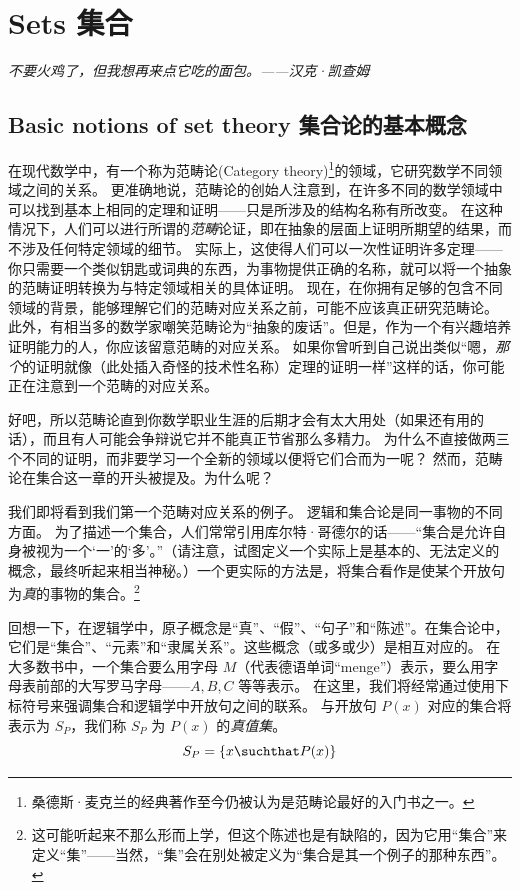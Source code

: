 \chapter{Sets 集合}
\label{ch:sets}

{\em 不要火鸡了，但我想再来点它吃的面包。——汉克·凯查姆}

\section{Basic notions of set theory 集合论的基本概念}
\label{sec:basic_set_notions}

在现代数学中，有一个称为范畴论(Category theory)\footnote{桑德斯·麦克兰的经典著作\cite{macl}至今仍被认为是范畴论最好的入门书之一。}的领域，它研究数学不同领域之间的关系。
更准确地说，范畴论的创始人注意到，在许多不同的数学领域中可以找到基本上相同的定理和证明——只是所涉及的结构名称有所改变。
在这种情况下，人们可以进行所谓的\emph{范畴}论证，即在抽象的层面上证明所期望的结果，而不涉及任何特定领域的细节。
实际上，这使得人们可以一次性证明许多定理——你只需要一个类似钥匙或词典的东西，为事物提供正确的名称，就可以将一个抽象的范畴证明转换为与特定领域相关的具体证明。
现在，在你拥有足够的包含不同领域的背景，能够理解它们的范畴对应关系之前，可能不应该真正研究范畴论。
此外，有相当多的数学家嘲笑范畴论为“抽象的废话”。但是，作为一个有兴趣培养证明能力的人，你应该留意范畴的对应关系。
如果你曾听到自己说出类似“嗯，\emph{那个}的证明就像（此处插入奇怪的技术性名称）定理的证明一样”这样的话，你可能正在注意到一个范畴的对应关系。

好吧，所以范畴论直到你数学职业生涯的后期才会有太大用处（如果还有用的话），而且有人可能会争辩说它并不能真正节省那么多精力。
为什么不直接做两三个不同的证明，而非要学习一个全新的领域以便将它们合而为一呢？
然而，范畴论在集合这一章的开头被提及。为什么呢？

我们即将看到我们第一个范畴对应关系的例子。
逻辑和集合论是同一事物的不同方面。
为了描述一个集合，人们常常引用库尔特·哥德尔的话——“集合是允许自身被视为一个‘一’的‘多’。”（请注意，试图定义一个实际上是基本的、无法定义的概念，最终听起来相当神秘。）一个更实际的方法是，将集合看作是使某个开放句为\emph{真}的事物的集合。\footnote{这可能听起来不那么形而上学，但这个陈述也是有缺陷的，因为它用“集合”来定义“集”——当然，“集”会在别处被定义为“集合是其一个例子的那种东西”。} 

回想一下，在逻辑学中，原子概念是“真”、“假”、“句子”和“陈述”。在集合论中，它们是“集合”、“元素”和“隶属关系”。这些概念（或多或少）是相互对应的。
在大多数书中，一个集合要么用字母 $M$（代表德语单词“menge”）表示，要么用字母表前部的大写罗马字母——$A, B, C$ 等等表示。
在这里，我们将经常通过使用下标符号来强调集合和逻辑学中开放句之间的联系。
与开放句 $P(x)$ 对应的集合将表示为 $S_P$，我们称 $S_P$ 为 $P(x)$ 的\emph{真值集}。
\[ S_P = \{ x \suchthat P(x) \} \]

